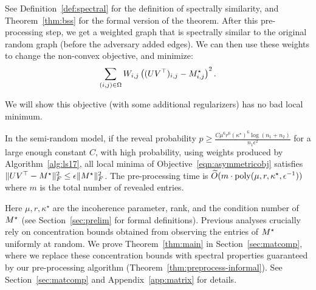 See Definition~\ref{def:spectral} for the definition of spectrally similarity, and Theorem~\ref{thm:bss} for the formal version of the theorem. 
After this pre-processing step, we get a weighted graph that is spectrally similar to the original random graph (before the adversary added edges). We can then use these weights to change the non-convex objective, and minimize:
\[
\sum_{(i,j)\in \Omega} W_{i,j} \left((UV^\top)_{i,j} - M^\star_{i,j}\right)^2.
\]

We will show this objective (with some additional regularizers) has no bad local minimum.

\begin{theorem}[Main]\label{thm:main}
In the semi-random model, if the reveal probability $p \ge \frac{C\mu^6r^6(\kappa^\star)^6\log (n_1+n_2)}{n_1\epsilon^2}$ for a large enough constant $C$, with high probability, using weights produced by Algorithm~\ref{alg:ls17}, all local minima of Objective~\eqref{eqn:asymmetricobj} satisfies $\|UV^\top - M^\star\|_F^2 \le \epsilon \|M^\star\|_F^2$. The pre-processing time is $\widetilde O(m \cdot \mathrm{poly}(\mu, r, \kappa^\star, \epsilon^{-1}))$ where $m$ is the total number of revealed entries. %
\end{theorem}

Here $\mu, r, \kappa^\star$ are the incoherence parameter, rank, and the condition number of $M^\star$ (see Section~\ref{sec:prelim} for formal definitions).
Previous analyses crucially rely on concentration bounds obtained from observing the entries of $M^\star$ uniformly at random.
We prove Theorem~\ref{thm:main} in Section~\ref{sec:matcomp}, where we replace these concentration bounds with spectral properties guaranteed by our pre-processing algorithm (Theorem~\ref{thm:preprocess-informal}).
See Section~\ref{sec:matcomp} and Appendix~\ref{app:matrix} for details.

%
%


